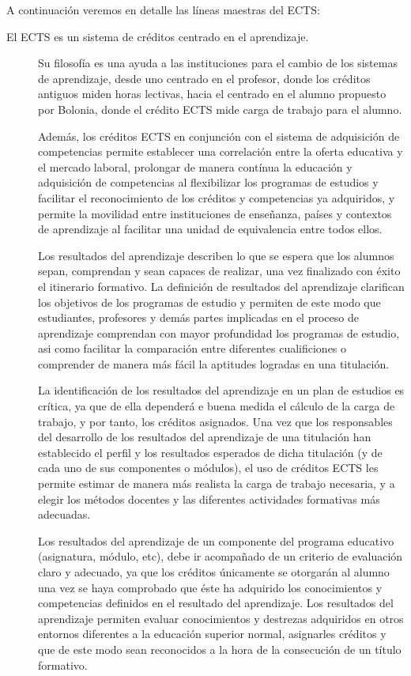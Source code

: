 		A continuación veremos en detalle las líneas maestras del ECTS:
		\begin{description}
    			\item[El ECTS es un sistema de créditos centrado en el aprendizaje.]Su filosofía es una ayuda a las instituciones para el cambio de los sistemas de aprendizaje, desde uno centrado en el profesor, donde los créditos antiguos miden horas lectivas, hacia el centrado en el alumno propuesto por Bolonia, donde el crédito ECTS mide carga de trabajo para el alumno.
    	
    			Además, los créditos ECTS en conjunción con el sistema de adquisición de competencias permite establecer una correlación entre la oferta educativa y el mercado laboral, prolongar de manera contínua la educación y adquisición de competencias al flexibilizar los programas de estudios y facilitar el reconocimiento de los créditos y competencias ya adquiridos, y permite la movilidad entre instituciones de enseñanza, países y contextos de aprendizaje al facilitar una unidad de equivalencia entre todos ellos. 
    	 
		    	Los resultados del aprendizaje describen lo que se espera que los alumnos sepan, comprendan y sean capaces de realizar, una vez finalizado con éxito el itinerario formativo. La definición de resultados del aprendizaje clarifican los objetivos de los programas de estudio y permiten de este modo que estudiantes, profesores y demás partes implicadas en el proceso de aprendizaje comprendan con mayor profundidad los programas de estudio, asi como facilitar la comparación entre diferentes cualificiones o comprender de manera más fácil la aptitudes logradas en una titulación.
    	
    			La identificación de los resultados del aprendizaje en un plan de estudios es crítica, ya que de ella dependerá e buena medida el cálculo de la carga de trabajo, y por tanto, los créditos asignados. Una vez que los responsables del desarrollo de los resultados del aprendizaje de una titulación han establecido el perfil y los resultados esperados de dicha titulación (y de cada uno de sus componentes o módulos), el uso de créditos ECTS les permite estimar de manera más realista la carga de trabajo necesaria, y a elegir los métodos docentes y las diferentes actividades formativas más adecuadas.
    	
    			Los resultados del aprendizaje de un componente del programa educativo (asignatura, módulo, etc), debe ir acompañado de un criterio de evaluación claro y adecuado, ya que los créditos únicamente se otorgarán al alumno una vez se haya comprobado que éste ha adquirido los conocimientos y competencias definidos en el resultado del aprendizaje. Los resultados del aprendizaje permiten evaluar conocimientos y destrezas adquiridos en otros entornos diferentes a la educación superior normal, asignarles créditos y que de este modo sean reconocidos a la hora de la consecución de un título formativo.
    	

\end{description}
